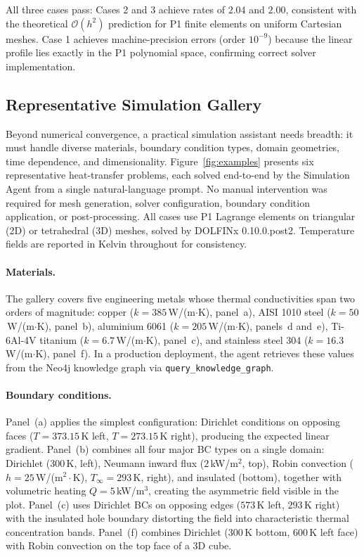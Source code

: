 \documentclass[preprint,review,12pt]{elsarticle}
\begin{document}
All three cases pass: Cases 2 and 3 achieve rates of $2.04$ and $2.00$,
consistent with the theoretical $\mathcal{O}(h^2)$ prediction for P1
finite elements on uniform Cartesian meshes.  Case 1 achieves machine-precision
errors (order $10^{-9}$) because the linear profile lies exactly in the P1
polynomial space, confirming correct solver implementation.

\subsection{Representative Simulation Gallery}
\label{sec:gallery}

Beyond numerical convergence, a practical simulation assistant needs
breadth: it must handle diverse materials, boundary
condition types, domain geometries, time dependence, and dimensionality.
Figure~\ref{fig:examples} presents six representative heat-transfer
problems, each solved end-to-end by the Simulation Agent from a single
natural-language prompt.  No manual intervention was required for mesh
generation, solver configuration, boundary condition application, or
post-processing.  All cases use P1 Lagrange elements on triangular
(2D) or tetrahedral (3D) meshes, solved by DOLFINx 0.10.0.post2.
Temperature fields are reported in Kelvin throughout for consistency.

\paragraph{Materials.}
The gallery covers five engineering metals whose thermal
conductivities span two orders of magnitude:
copper ($k=385$\,W/(m$\cdot$K), panel~a),
AISI 1010 steel ($k=50$\,W/(m$\cdot$K), panel~b),
aluminium 6061 ($k=205$\,W/(m$\cdot$K), panels~d and~e),
Ti-6Al-4V titanium ($k=6.7$\,W/(m$\cdot$K), panel~c),
and stainless steel 304 ($k=16.3$\,W/(m$\cdot$K), panel~f).
In a production deployment, the agent retrieves these values from the
Neo4j knowledge graph via \texttt{query\_knowledge\_graph}.

\paragraph{Boundary conditions.}
Panel~(a) applies the simplest configuration: Dirichlet conditions on
opposing faces ($T=373.15$\,K left, $T=273.15$\,K right), producing
the expected linear gradient.  Panel~(b) combines all four major
BC types on a single domain: Dirichlet ($300$\,K, left), Neumann
inward flux ($2$\,kW/m$^2$, top), Robin convection ($h=25$\,W/(m$^2
\cdot$K), $T_\infty=293$\,K, right), and insulated (bottom), together
with volumetric heating $Q=5$\,kW/m$^3$, creating the asymmetric
field visible in the plot.  Panel~(c) uses Dirichlet BCs on opposing
edges ($573$\,K left, $293$\,K right) with the insulated hole boundary
distorting the field into characteristic thermal concentration bands.
Panel~(f) combines Dirichlet ($300$\,K bottom, $600$\,K left face)
with Robin convection on the top face of a 3D cube.
\end{document}
